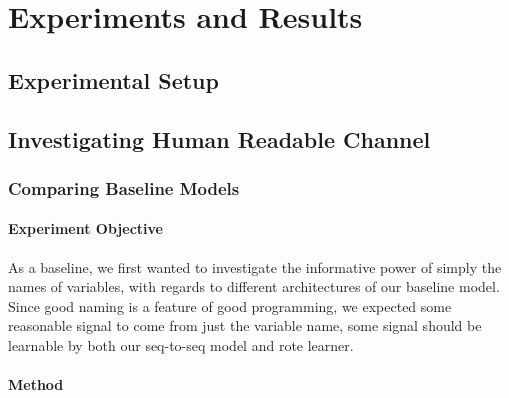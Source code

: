 \chapter{Experiments and Results}
\label{experiments_and_results}

\section{Experimental Setup} %
\label{sec:experimental_setup}


\section{Investigating Human Readable Channel} %
\label{sec:investigating_human_readable_channel}

\subsection{Comparing Baseline Models} %
\label{sub:comparing_baseline_models}

\subsubsection{Experiment Objective} %

As a baseline, we first wanted to investigate the informative power of simply the names of variables, with regards to different architectures of our baseline model.
Since good naming is a feature of good programming, we expected some reasonable signal to come from just the variable name, some signal should be learnable by both our seq-to-seq model and rote learner.

\subsubsection{Method} %

